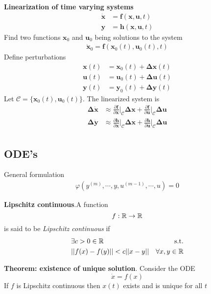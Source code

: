 \textbf{Linearization of time varying systems}
\begin{align*}
    \dot{\bm{x}} &= \bm{f}(\bm{x},\bm{u},t) \\
    \bm{y} &= \bm{h}(\bm{x},\bm{u},t)
\end{align*}
Find two functions \(\bm{x}_0\) and \(\bm{u}_0\) being solutions to the system
\begin{align*}
    \dot{\bm{x}}_0 = \bm{f}(\bm{x}_0(t),\bm{u}_0(t),t)
\end{align*}
Define perturbations
\begin{align*}
    \bm{x}(t) &= \bm{x}_0(t) + \bm{\Delta x}(t) \\
    \bm{u}(t) &= \bm{u}_0(t) + \bm{\Delta u}(t) \\
    \bm{y}(t) &= \bm{y}_0(t) + \bm{\Delta y}(t)
\end{align*}
Let \(\mathcal{C} = \{\bm{x}_0(t),\bm{u}_0(t)\}\). The linearized system is
\begin{align*}
    \bm{\Delta \dot{x}} &\approx \frac{\partial\bm{f}}{\partial\bm{x}}\Big|_{\mathcal{C}} \bm{\Delta x} +
        \frac{\partial\bm{f}}{\partial\bm{u}}\Big|_{\mathcal{C}}\bm{\Delta u} \\
    \bm{\Delta \dot{y}} &\approx \frac{\partial\bm{h}}{\partial\bm{x}}\Big|_{\mathcal{C}} \bm{\Delta x} +
        \frac{\partial\bm{h}}{\partial\bm{u}}\Big|_{\mathcal{C}}\bm{\Delta u} \\
\end{align*}

\setcounter{subsection}{4}
\subsection{ODE's} %
General formulation
\begin{align*}
    \varphi(y^{(m)},\cdots,y,u^{(m-1)},\cdots,u) = 0
\end{align*}

\textbf{Lipschitz continuous}.A function \[f:\mathbb{R} \rightarrow \mathbb{R}\] is said to be \textit{Lipschitz continuous} if
\begin{align*}
    &\exists c > 0 \in \mathbb{R} & \textrm{s.t.}\\ &||f(x)-f(y)||<c||x-y|| & \forall x, y \in \mathbb{R}
\end{align*}

\textbf{Theorem: existence of unique solution}. Consider the ODE
\[\dot{x}=f(x)\]
If \(f\) is Lipschitz continuous then \(x(t)\) exists and is unique for all \(t\)
\newline

